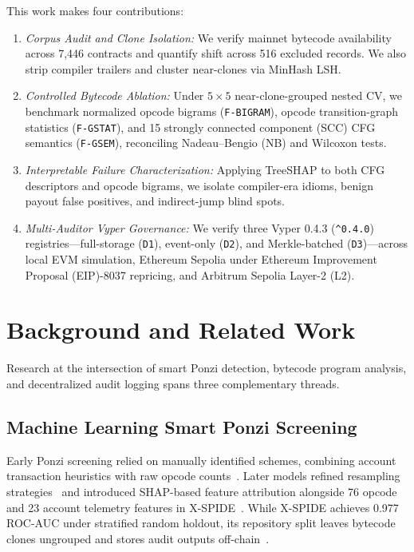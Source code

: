 \documentclass[conference]{IEEEtran}
\begin{document}
This work makes four contributions:
\begin{enumerate}
\item \emph{Corpus Audit and Clone Isolation:} We verify mainnet bytecode availability across 7,446 contracts and quantify shift across 516 excluded records. We also strip compiler trailers and cluster near-clones via MinHash LSH\@.
\item \emph{Controlled Bytecode Ablation:} Under $5\times 5$ near-clone-grouped nested CV, we benchmark normalized opcode bigrams (\texttt{F-BIGRAM}), opcode transition-graph statistics (\texttt{F-GSTAT}), and 15 strongly connected component (SCC) CFG semantics (\texttt{F-GSEM}), reconciling Nadeau--Bengio (NB) and Wilcoxon tests.
\item \emph{Interpretable Failure Characterization:} Applying TreeSHAP to both CFG descriptors and opcode bigrams, we isolate compiler-era idioms, benign payout false positives, and indirect-jump blind spots.
\item \emph{Multi-Auditor Vyper Governance:} We verify three Vyper 0.4.3 (\texttt{\string^0.4.0}) registries---full-storage (\texttt{D1}), event-only (\texttt{D2}), and Merkle-batched (\texttt{D3})---across local EVM simulation, Ethereum Sepolia under Ethereum Improvement Proposal (EIP)-8037 repricing, and Arbitrum Sepolia Layer-2 (L2).
\end{enumerate}

\section{Background and Related Work}\label{sec:related}

Research at the intersection of smart Ponzi detection, bytecode program analysis, and decentralized audit logging spans three complementary threads.

\subsection{Machine Learning Smart Ponzi Screening}\label{sec:related_ml}

Early Ponzi screening relied on manually identified schemes, combining account transaction heuristics with raw opcode counts~\cite{chen2018ponzi,bartoletti2020dissecting}. Later models refined resampling strategies~\cite{fan2020expose} and introduced SHAP-based feature attribution alongside 76 opcode and 23 account telemetry features in X-SPIDE~\cite{pennella2025xspide}. While X-SPIDE achieves 0.977 ROC-AUC under stratified random holdout, its repository split leaves bytecode clones ungrouped and stores audit outputs off-chain~\cite{pennella2025repo}.
\end{document}
